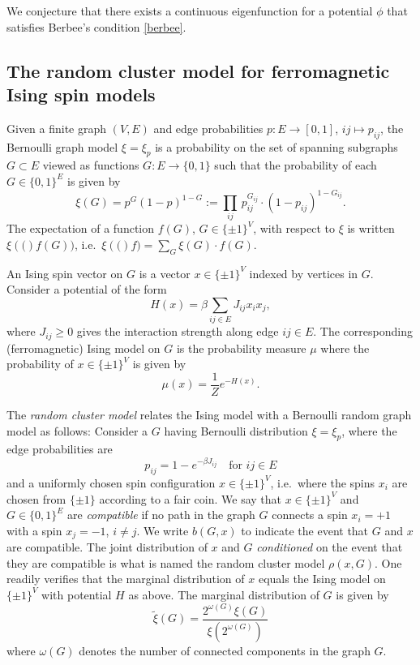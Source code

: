 \documentclass[11pt, a4paper, oneside]{scrartcl}
\theoremstyle{definition}
\theoremstyle{remark}
\providecommand{\tl}{\tilde}
\begin{document}
We conjecture that there exists a continuous eigenfunction for a potential
$\phi$ that satisfies Berbee's condition \eqref{berbee}.

\subsection{The random cluster model for ferromagnetic Ising spin models}

\def\SI{\{\pm1\}}
\def\SB{\{0,1\}}
\def\b{b}
\def\XI#1{\xi\left(#1\right)}
\def\t{G}

Given a finite graph $(V,E)$ and edge probabilities $p:E\to[0,1]$, $ij\mapsto p_{ij}$, the
Bernoulli graph model $\xi = \xi_p$ is a probability on the set of spanning subgraphs
$\t\subset E$ viewed as functions $\t:E\to\{0,1\}$ such that the probability of each
$\t\in\{0,1\}^E$ is given by
\[ \xi(\t) = p^\t(1-p)^{1-\t} := \prod_{ij}\, p_{ij}^{\t_{ij}}\cdot
  (1-p_{ij})^{1-\t_{ij}}. \]
The expectation of a function $f(\t)$, $\t\in\SI^V$,
with respect to $\xi$ is written $\XI(f(\t))$, i.e.\
\(\XI(f) = \sum_{\t} \xi(\t)\cdot f(\t)\).

An Ising spin vector on $G$ is a vector $x\in\SI^V$ indexed by vertices in $G$.
Consider a potential of the form
\[ H(x) = \beta \sum_{ij\in E} J_{ij} x_i x_j, \] where $J_{ij}\geq 0$ gives the
interaction strength along edge $ij\in E$. The corresponding (ferromagnetic)
Ising model on $G$ is the probability measure $\mu$ where the probability of
$x\in \SI^V$ is given by
\[ \mu(x) = \frac 1{Z} e^{-H(x)}. \]

The \emph{random cluster model} relates the Ising model with a Bernoulli random
graph model as follows: Consider a $\t$ having Bernoulli distribution
$\xi=\xi_p$, where the edge probabilities are
\[ p_{ij} = 1 - e^{-\beta J_{ij}} \quad \text{for $ij\in E$}\] and a uniformly
chosen spin configuration $x\in\SI^V$, i.e.\ where the spins $x_i$ are chosen
from $\SI$ according to a fair coin. We say that $x\in \SI^V$ and $\t\in\SB^E$
are \emph{compatible} if no path in the graph $\t$ connects a spin $x_i=+1$ with
a spin $x_j=-1$, $i\not=j$. We write $\b(\t,x)$ to indicate the event that $\t$
and $x$ are compatible. The joint distribution of $x$ and $\t$ \emph{conditioned}
on the event that they are compatible is what is named the random cluster model
$\rho(x,\t)$. One readily verifies that the marginal distribution of $x$ equals the
Ising model on $\SI^V$ with potential $H$ as above. The marginal distribution of
$\t$ is given by
\[
  \tl\xi(\t) = \frac{2^{\omega(\t)}\xi(\t)}{\xi(2^{\omega(\t)})}
\]
where $\omega(\t)$ denotes the number of connected components in the graph $\t$.
\end{document}
